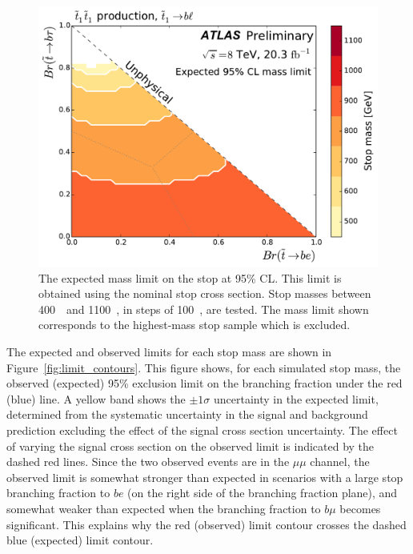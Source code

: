 \begin{figure}[p]
  \centering
  \includegraphics[width=\textwidth]
    {figs/blstop/mass_limit_contours_no_extras_exp.pdf}
  \caption{The expected mass limit on the stop at 95\% CL.
    This limit is obtained using the nominal stop cross section.
    Stop masses between 400~\GeV\ and 1100~\GeV, in steps of 100~\GeV, are
    tested.
    The mass limit shown corresponds to the highest-mass stop sample which is
    excluded.
  }
  \label{fig:mass_limit_exp}
\end{figure}

The expected and observed limits for each stop mass are shown in
Figure~\ref{fig:limit_contours}.
This figure shows, for each simulated stop mass, the observed (expected)
95\% exclusion limit on the branching fraction under the red (blue) line.
A yellow band shows the $\pm 1\sigma$ uncertainty in the expected limit,
determined from the systematic uncertainty in the signal and background
prediction excluding the effect of the signal cross section uncertainty.
The effect of varying the signal cross section on the observed limit is
indicated by the dashed red lines.
Since the two observed events are in the $\mu\mu$ channel, the observed limit
is somewhat stronger than expected in scenarios with a large stop branching
fraction to $be$ (on the right side of the branching fraction plane), and somewhat
weaker than expected when the branching fraction to $b\mu$ becomes significant.
This explains why the red (observed) limit contour crosses the dashed
blue (expected) limit contour.

